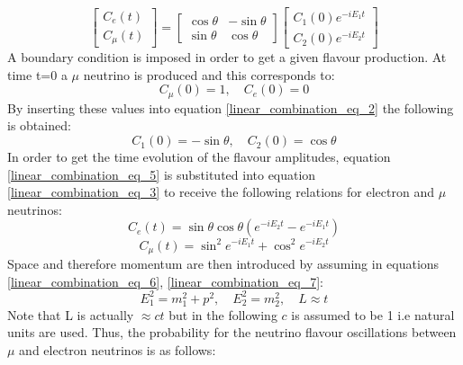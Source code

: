 \begin{equation}
    \begin{bmatrix}
        C_e(t) \\
        C_\mu(t)
    \end{bmatrix}
    =
    \begin{bmatrix}
        \cos\theta & -\sin\theta \\
        \sin\theta & \cos\theta 
    \end{bmatrix}
        \begin{bmatrix}
        C_1(0)e^{-iE_1t} \\
        C_2(0)e^{-iE_2t}
    \end{bmatrix}
    \label{linear_combination_eq_3}
\end{equation}
A boundary condition is imposed in order to get a given flavour production. At time t=0 a $\mu$ neutrino is produced and this corresponds to:
\begin{equation}
    C_\mu(0) = 1, \quad C_e(0) = 0
    \label{linear_combination_eq_4}
\end{equation}
By inserting these values into equation \ref{linear_combination_eq_2} the following is obtained:
\begin{equation}
    C_1(0) = -\sin\theta, \quad C_2(0) = \cos\theta
    \label{linear_combination_eq_5}
\end{equation}
In order to get the time evolution of the flavour amplitudes, equation \ref{linear_combination_eq_5} is substituted into equation \ref{linear_combination_eq_3} to receive the following relations for electron and $\mu$ neutrinos: 
\begin{equation}
    C_e(t)=\sin\theta\cos\theta(e^{-iE_2t}-e^{-iE_1t})
    \label{linear_combination_eq_6}
\end{equation}
\begin{equation}
    C_\mu(t)=\sin^{2}e^{-iE_1t} + \cos^{2}e^{-iE_2t}
    \label{linear_combination_eq_7}
\end{equation}
Space and therefore momentum are then introduced by assuming in equations \ref{linear_combination_eq_6}, \ref{linear_combination_eq_7}: 
\begin{equation}
   E_1^2=m_1^2 + p^2, \quad E_2^2=m_2^2  , \quad L \approx t
    \label{linear_combination_eq_8}
\end{equation}
Note that L is actually $\approx ct$ but in the following $c$ is assumed to be 1 i.e natural units are used. Thus, the probability for the neutrino flavour oscillations between $\mu$ and electron neutrinos is as follows: 
